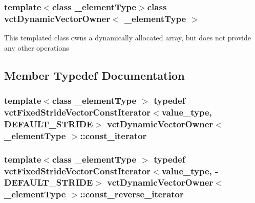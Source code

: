 \subsubsection*{template$<$class \+\_\+element\+Type$>$class vct\+Dynamic\+Vector\+Owner$<$ \+\_\+element\+Type $>$}

This templated class owns a dynamically allocated array, but does not provide any other operations 

\subsection{Member Typedef Documentation}
\hypertarget{classvct_dynamic_vector_owner_a607608d191422c1d82168ffecd37c853}{}
\subsubsection[{const\+\_\+iterator}]{\setlength{\rightskip}{0pt plus 5cm}template$<$class \+\_\+element\+Type $>$ typedef {\bf vct\+Fixed\+Stride\+Vector\+Const\+Iterator}$<$value\+\_\+type, {\bf D\+E\+F\+A\+U\+L\+T\+\_\+\+S\+T\+R\+I\+D\+E}$>$ {\bf vct\+Dynamic\+Vector\+Owner}$<$ \+\_\+element\+Type $>$\+::{\bf const\+\_\+iterator}}\label{classvct_dynamic_vector_owner_a607608d191422c1d82168ffecd37c853}
\hypertarget{classvct_dynamic_vector_owner_ab157dd93c9061bb74e4a5983606e200a}{}
\subsubsection[{const\+\_\+reverse\+\_\+iterator}]{\setlength{\rightskip}{0pt plus 5cm}template$<$class \+\_\+element\+Type $>$ typedef {\bf vct\+Fixed\+Stride\+Vector\+Const\+Iterator}$<$value\+\_\+type, -\/{\bf D\+E\+F\+A\+U\+L\+T\+\_\+\+S\+T\+R\+I\+D\+E}$>$ {\bf vct\+Dynamic\+Vector\+Owner}$<$ \+\_\+element\+Type $>$\+::{\bf const\+\_\+reverse\+\_\+iterator}}\label{classvct_dynamic_vector_owner_ab157dd93c9061bb74e4a5983606e200a}
\hypertarget{classvct_dynamic_vector_owner_a0ef55f887d1340204d64f21d4db08fad}{}
